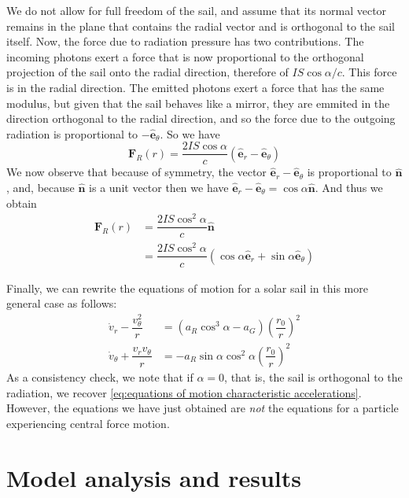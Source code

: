 \documentclass[twocolumn,12pt,a4paper]{article}
\numberwithin{equation}{section}
\begin{document}
We do not allow for full freedom of the sail, and assume that its normal vector remains in the plane that contains the radial vector and is orthogonal to the sail itself. Now, the force due to radiation pressure has two contributions. The incoming photons exert a force that is now proportional to the orthogonal projection of the sail onto the radial direction, therefore of \( IS\cos{\alpha}/c \). This force is in the radial direction. The emitted photons exert a force that has the same modulus, but given that the sail behaves like a mirror, they are emmited in the direction orthogonal to the radial direction, and so the force due to the outgoing radiation is proportional to \( {-\hat{\mathbf{e}}_{\theta}} \). So we have
\begin{equation}
  \mathbf{F}_R(r) = \dfrac{2IS \cos{\alpha}}{c} ( \hat{\mathbf{e}}_{r} - \hat{\mathbf{e}}_{\theta})
\end{equation}
We now observe that because of symmetry, the vector \( \hat{\mathbf{e}}_{r} - \hat{\mathbf{e}}_{\theta}  \) is proportional to \( \hat{\mathbf{n}} \), and, because \( \hat{\mathbf{n}} \) is a unit vector then we have \( \hat{\mathbf{e}}_{r} - \hat{\mathbf{e}}_{\theta} = \cos{\alpha} \hat{\mathbf{n}} \). 
And thus we obtain
\begin{align}
  \mathbf{F}_R(r) &= \dfrac{2IS \cos^2{\alpha}}{c} \hat{\mathbf{n}} \\
									&= \dfrac{2IS \cos^2{\alpha}}{c} (\cos{\alpha} \hat{\mathbf{e}}_r + \sin{\alpha} \hat{\mathbf{e}}_{\theta}) 
\end{align}

Finally, we can rewrite the equations of motion for a solar sail in this more general case as follows:
\begin{align} \label{eq:equations of motion general case}
  \dot{v}_r - \dfrac{v_{\theta}^2}{r} &= (a_R \cos^3{\alpha} - a_G) \left(\dfrac{r_0}{r}\right)^2 \\ 
  \dot{v}_{\theta} + \dfrac{v_r v_{\theta}}{r} &= -a_R	\sin{\alpha} \cos^2{\alpha} \left(\dfrac{r_0}{r}\right)^2
\end{align}
As a consistency check, we note that if \( \alpha = 0 \), that is, the sail is orthogonal to the radiation, we recover \autoref{eq:equations of motion characteristic accelerations}. However, the equations we have just obtained are \emph{not} the equations for a particle experiencing central force motion.   

\section{Model analysis and results}
\end{document}
